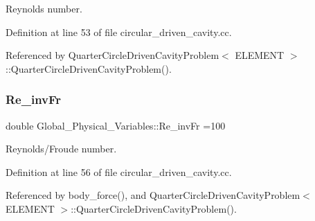 Reynolds number. 



Definition at line 53 of file circular\+\_\+driven\+\_\+cavity.\+cc.



Referenced by Quarter\+Circle\+Driven\+Cavity\+Problem$<$ E\+L\+E\+M\+E\+N\+T $>$\+::\+Quarter\+Circle\+Driven\+Cavity\+Problem().

\mbox{\label{namespaceGlobal__Physical__Variables_ab1a845a672b4d74b304639a976dc65c6}} 
\subsubsection{\texorpdfstring{Re\+\_\+inv\+Fr}{Re\_invFr}}
{\footnotesize\ttfamily double Global\+\_\+\+Physical\+\_\+\+Variables\+::\+Re\+\_\+inv\+Fr =100}



Reynolds/\+Froude number. 



Definition at line 56 of file circular\+\_\+driven\+\_\+cavity.\+cc.



Referenced by body\+\_\+force(), and Quarter\+Circle\+Driven\+Cavity\+Problem$<$ E\+L\+E\+M\+E\+N\+T $>$\+::\+Quarter\+Circle\+Driven\+Cavity\+Problem().


